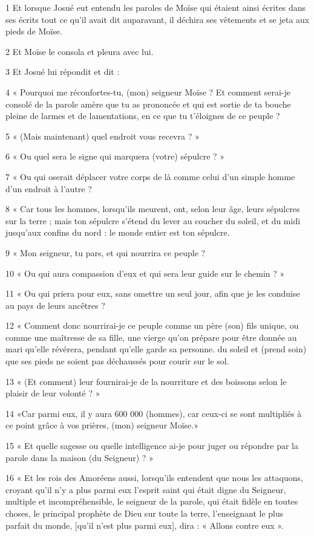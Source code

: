 \par 1 Et lorsque Josué eut entendu les paroles de Moïse qui étaient ainsi écrites dans ses écrits tout ce qu'il avait dit auparavant, il déchira ses vêtements et se jeta aux pieds de Moïse.
\par 2 Et Moïse le consola et pleura avec lui.
\par 3 Et Josué lui répondit et dit :
\par 4 « Pourquoi me réconfortes-tu, (mon) seigneur Moïse ? Et comment serai-je consolé de la parole amère que tu as prononcée et qui est sortie de ta bouche pleine de larmes et de lamentations, en ce que tu t'éloignes de ce peuple ?
\par 5 « (Mais maintenant) quel endroit vous recevra ? »
\par 6 « Ou quel sera le signe qui marquera (votre) sépulcre ? »
\par 7 « Ou qui oserait déplacer votre corps de là comme celui d'un simple homme d'un endroit à l'autre ?
\par 8 « Car tous les hommes, lorsqu'ils meurent, ont, selon leur âge, leurs sépulcres sur la terre ; mais ton sépulcre s'étend du lever au coucher du soleil, et du midi jusqu'aux confins du nord : le monde entier est ton sépulcre.
\par 9 « Mon seigneur, tu pars, et qui nourrira ce peuple ?
\par 10 « Ou qui aura compassion d'eux et qui sera leur guide sur le chemin ? »
\par 11 « Ou qui priera pour eux, sans omettre un seul jour, afin que je les conduise au pays de leurs ancêtres ?
\par 12 « Comment donc nourrirai-je ce peuple comme un père (son) fils unique, ou comme une maîtresse de sa fille, une vierge qu'on prépare pour être donnée au mari qu'elle révérera, pendant qu'elle garde sa personne. du soleil et (prend soin) que ses pieds ne soient pas déchaussés pour courir sur le sol.
\par 13 « (Et comment) leur fournirai-je de la nourriture et des boissons selon le plaisir de leur volonté ? »
\par 14 «Car parmi eux, il y aura 600 000 (hommes), car ceux-ci se sont multipliés à ce point grâce à vos prières, (mon) seigneur Moïse.»
\par 15 « Et quelle sagesse ou quelle intelligence ai-je pour juger ou répondre par la parole dans la maison (du Seigneur) ? »
\par 16 « Et les rois des Amoréens aussi, lorsqu'ils entendent que nous les attaquons, croyant qu'il n'y a plus parmi eux l'esprit saint qui était digne du Seigneur, multiple et incompréhensible, le seigneur de la parole, qui était fidèle en toutes choses, le principal prophète de Dieu sur toute la terre, l'enseignant le plus parfait du monde, [qu'il n'est plus parmi eux], dira : « Allons contre eux ».
